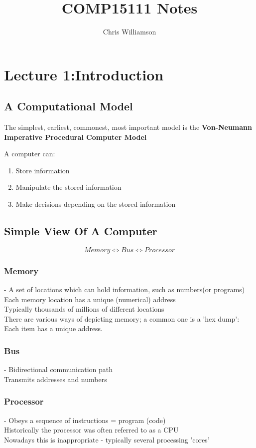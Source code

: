 \documentclass{article}
\begin{document}
\author{Chris Williamson}
\title{COMP15111 Notes}
\maketitle
\tableofcontents
\newpage
\section{Lecture 1:Introduction}
\subsection{A Computational Model}
The simplest, earliest, commonest, most important model is the \textbf{Von-Neumann Imperative Procedural Computer Model}

A computer can:
\begin{enumerate}
\item Store information
\item Manipulate the stored information
\item Make decisions depending on the stored information
\end{enumerate}

\subsection{Simple View Of A Computer}
\[Memory \Leftrightarrow Bus \Leftrightarrow Processor\]

\subsubsection{\textbf{Memory}} - A set of locations which can hold information, such as numbers(or programs)\\
Each memory location has a unique (numerical) address\\
Typically thousands of millions of different locations\\
There are various ways of depicting memory; a common one is a 'hex dump':\\
Each item has a unique address.

\subsubsection{\textbf{Bus}} - Bidirectional communication path\\
Transmits addresses and numbers

\subsubsection{\textbf{Processor}} - Obeys a sequence of instructions = program (code)\\
Historically the processor was often referred to as a CPU\\
Nowadays this is inappropriate - typically several processing 'cores'
\end{document}
